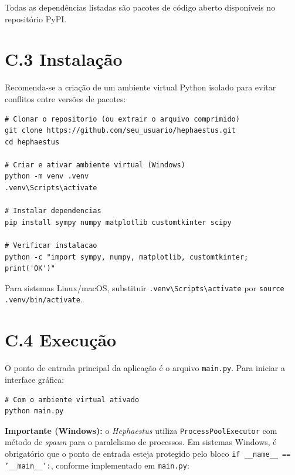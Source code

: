 Todas as dependências listadas são pacotes de código aberto disponíveis no repositório PyPI.

\section*{C.3 Instalação}

Recomenda-se a criação de um ambiente virtual Python isolado para evitar conflitos entre versões de pacotes:

\begin{lstlisting}[style=bash, caption={Criação de ambiente virtual e instalação das dependências.}, label={lst:install}]
# Clonar o repositorio (ou extrair o arquivo comprimido)
git clone https://github.com/seu_usuario/hephaestus.git
cd hephaestus

# Criar e ativar ambiente virtual (Windows)
python -m venv .venv
.venv\Scripts\activate

# Instalar dependencias
pip install sympy numpy matplotlib customtkinter scipy

# Verificar instalacao
python -c "import sympy, numpy, matplotlib, customtkinter; print('OK')"
\end{lstlisting}

Para sistemas Linux/macOS, substituir \texttt{.venv\textbackslash Scripts\textbackslash activate} por \texttt{source .venv/bin/activate}.

\section*{C.4 Execução}

O ponto de entrada principal da aplicação é o arquivo \texttt{main.py}. Para iniciar a interface gráfica:

\begin{lstlisting}[style=bash, caption={Execução da interface gráfica do Hephaestus.}, label={lst:run}]
# Com o ambiente virtual ativado
python main.py
\end{lstlisting}

\textbf{Importante (Windows):} o \textit{Hephaestus} utiliza \texttt{ProcessPoolExecutor} com método de \textit{spawn} para o paralelismo de processos. Em sistemas Windows, é obrigatório que o ponto de entrada esteja protegido pelo bloco \texttt{if \_\_name\_\_ == '\_\_main\_\_':}, conforme implementado em \texttt{main.py}:

